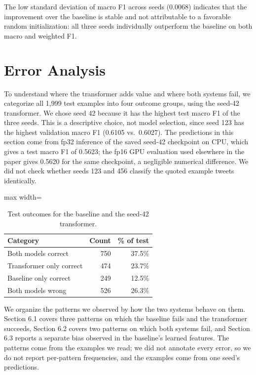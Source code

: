 The low standard deviation of macro F1 across seeds (0.0068) indicates that the improvement over the baseline is stable and not attributable to a favorable random initialization: all three seeds individually outperform the baseline on both macro and weighted F1.


\section{Error Analysis}

To understand where the transformer adds value and where both systems fail, we categorize all 1,999 test examples into four outcome groups, using the seed-42 transformer. We chose seed 42 because it has the highest test macro F1 of the three seeds. This is a descriptive choice, not model selection, since seed 123 has the highest validation macro F1 (0.6105 vs.~0.6027). The predictions in this section come from fp32 inference of the saved seed-42 checkpoint on CPU, which gives a test macro F1 of 0.5623; the fp16 GPU evaluation used elsewhere in the paper gives 0.5620 for the same checkpoint, a negligible numerical difference. We did not check whether seeds 123 and 456 classify the quoted example tweets identically.

\begin{table}[t]
\centering\small
\begin{adjustbox}{max width=\linewidth}
\begin{tabular}{lrr}
\toprule
Category & Count & \% of test \\
\midrule
Both models correct & 750 & 37.5\% \\
Transformer only correct & 474 & 23.7\% \\
Baseline only correct & 249 & 12.5\% \\
Both models wrong & 526 & 26.3\% \\
\bottomrule
\end{tabular}
\end{adjustbox}
\caption{Test outcomes for the baseline and the seed-42 transformer.}
\label{tab:outcomes}
\end{table}

We organize the patterns we observed by how the two systems behave on them. Section 6.1 covers three patterns on which the baseline fails and the transformer succeeds, Section 6.2 covers two patterns on which both systems fail, and Section 6.3 reports a separate bias observed in the baseline's learned features. The patterns come from the examples we read; we did not annotate every error, so we do not report per-pattern frequencies, and the examples come from one seed's predictions.

